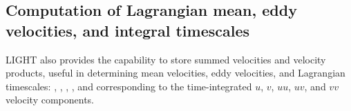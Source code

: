 
\subsection{Computation of Lagrangian mean, eddy velocities, and integral timescales}
LIGHT also provides the capability to store summed velocities and velocity
products, useful in determining mean velocities, eddy velocities, and
Lagrangian timescales: , , , ,
and  corresponding to the time-integrated $u$, $v$, $uu$, $uv$, and
$vv$ velocity components.

